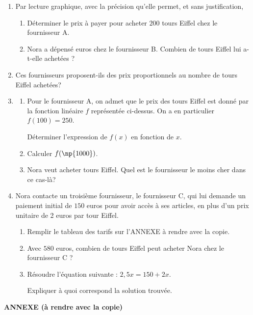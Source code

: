\documentclass[11pt]{article}
\begin{document}
\medskip

\begin{enumerate}
\item Par lecture graphique, avec la précision qu'elle permet, et sans justification,
	\begin{enumerate}
		\item Déterminer le prix à payer pour acheter $200$ tours Eiffel chez le fournisseur A.
		\item Nora a dépensé  euros chez le fournisseur B. Combien de tours Eiffel lui a-t-elle achetées ?
	\end{enumerate}
\item Ces fournisseurs proposent-ils des prix proportionnels au nombre de tours Eiffel achetées?
\item
	\begin{enumerate}
		\item Pour le fournisseur A, on admet que le prix des tours Eiffel est donné par la fonction linéaire $f$ représentée ci-dessus. On a en particulier $f(100) = 250$.
		
Déterminer l'expression de $f(x)$ en fonction de $x$.
		\item Calculer $f(\np{1000})$.
		\item Nora veut acheter  tours Eiffel. Quel est le fournisseur le moins cher dans ce cas-là?
	\end{enumerate}
\item  Nora contacte un troisième fournisseur, le fournisseur C, qui lui demande un paiement initial de $150$ euros pour avoir accès à ses articles, en plus d'un prix unitaire de 2 euros par tour Eiffel.
	\begin{enumerate}
		\item Remplir le tableau des tarifs sur l'ANNEXE à rendre avec la copie.
		\item Avec $580$ euros, combien de tours Eiffel peut acheter Nora chez le fournisseur C ?
		\item Résoudre l'équation suivante : $2,5x = 150 + 2x$.
		
Expliquer à quoi correspond la solution trouvée.
	\end{enumerate}
\end{enumerate}

\newpage

\begin{center}\textbf{\Large ANNEXE (à rendre avec la copie)}\end{center}
\end{document}
